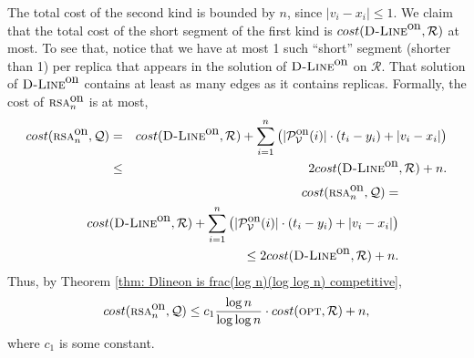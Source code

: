 \documentclass[11pt]{article}
\newcommand{\cost}[0]{cost}
\newcommand{\calV}{\mathcal{V}}
\newcommand{\calR}{\mathcal{R}}
\newcommand{\calQ}{\mathcal{Q}}
\newcommand{\calP}{\mathcal{P}}
\newcommand{\opt}{\mbox{\textsc{opt}}}
\newcommand{\onRSAn}{\mbox{\sc rsa}^{\mbox{\upshape on}}_{\nn}}
\newcommand{\nn}{n}
\newcommand{\PVon}[0]{\calP_\calV^{\mbox{\upshape\small on}}}
\newcommand{\Dlineon}[0]{\mbox{{\sc D-Line}}^{\mbox{\upshape on}}}
\newcommand{\loglogratio}[1]{\frac{\log #1}{\log\log #1}}
\begin{document}
{The total cost of the second kind is bounded by $n$, since $|v_i-x_i|\leq1$.
We claim that the total cost of the short segment of the first kind is $\cost(\Dlineon,\calR)$ at most.
To see that, notice that we have at most 1 such ``short'' segment (shorter than 1) per replica that appears in the solution of $\Dlineon$ on $\calR$.
That solution of $\Dlineon$ contains at least as many edges as it contains replicas.
Formally, the cost of $\onRSAn$ is at most,
\commsingle
\begin{eqnarray*}
\cost(\onRSAn,\calQ)&=&\cost(\Dlineon,\calR)+\sum_{i=1}^{\nn}\big(|\PVon(i)|\cdot(t_i-y_i)
+
|v_i-x_i|\big)\nonumber\\
&\leq& 2\cost(\Dlineon,\calR)+\nn.
\label{ineq: cost onRSAmn Q leq cost onalgmn Z}
\end{eqnarray*}
\commsingleend
\commdouble
\begin{eqnarray*}
&&\cost(\onRSAn,\calQ)=\nonumber\\
&&\cost(\Dlineon,\calR)+\sum_{i=1}^{\nn}\big(|\PVon(i)|\cdot(t_i-y_i)
+
|v_i-x_i|\big)\nonumber\\
&&\leq 2\cost(\Dlineon,\calR)+\nn.
\label{ineq: cost onRSAmn Q leq cost onalgmn Z}
\end{eqnarray*}
\commdoubleend
Thus, by Theorem \ref{thm: Dlineon is frac(log n)(log log n) competitive},
\begin{eqnarray}
\cost(\onRSAn,\calQ)\leq
c_1\loglogratio{\nn}\cdot\cost(\opt,\calR)+\nn,
\label{ineq: c(onRSAn, Q) leq c1 sqrt log c(opt,R)+n}
\end{eqnarray}
where $c_1$ is some constant.


}
\end{document}
